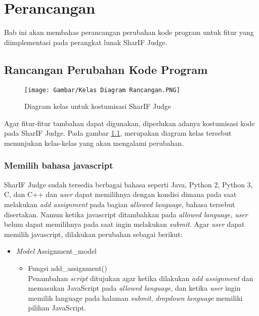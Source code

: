 \chapter{Perancangan}
\label{chap: Perancangan}
Bab ini akan membahas perancangan perubahan kode program untuk fitur yang diimplementasi pada perangkat lunak SharIF Judge.

\section{Rancangan Perubahan Kode Program}
\label{sec: Rancangan Perubahan Kode Program}
\begin{figure}[h!]
     \centering
     \texttt{[image: Gambar/Kelas Diagram Rancangan.PNG]}
     \caption{Diagram kelas untuk kostumisasi SharIF Judge}
     \label{fig:Diagramkelasrancangan}
 \end{figure}
 Agar fitur-fitur tambahan dapat digunakan, diperlukan adanya kostumisasi kode pada SharIF Judge. Pada gambar \ref{fig:Diagramkelasrancangan}, merupakan diagram kelas tersebut menunjukan kelas-kelas yang akan mengalami perubahan.
 
 \subsection{Memilih bahasa javascript}
 SharIF Judge sudah tersedia berbagai bahasa seperti Java, Python 2, Python 3, C, dan C++ dan \textit{user} dapat memilihnya dengan kondisi dimana pada saat melakukan \textit{add assignment} pada bagian \textit{allowed language}, bahasa tersebut disertakan. Namun ketika javascript ditambahkan pada \textit{allowed language}, \textit{user} belum dapat memilihnya pada saat ingin melakukan \textit{submit}. Agar \textit{user} dapat memilih javascript, dilakukan perubahan sebagai berikut: 
 
 \begin{itemize}
     \item \textit{Model} Assignment\_model
     \begin{itemize}
         \item Fungsi add\_assignment()\\
         Penambahan \textit{script} ditujukan agar ketika dilakukan \textit{add assignment} dan memasukan JavaScript pada \textit{allowed language}, dan ketika \textit{user} ingin memilih language pada halaman \textit{submit}, \textit{dropdown language} memiliki pilihan JavaScript.
     \end{itemize}
 \end{itemize}
 
